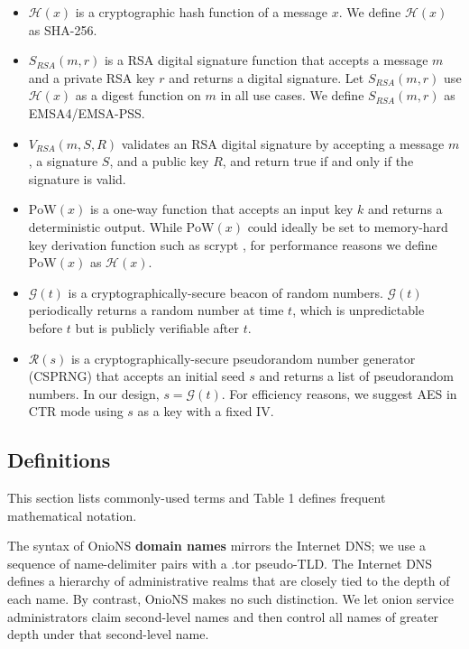 \documentclass[USenglish,oneside,twocolumn]{article}
\begin{document}
\begin{itemize}
	\item $ \mathcal{H}(x) $ is a cryptographic hash function of a message $ x $. We define $ \mathcal{H}(x) $ as SHA-256.
	\item $ S_{\mathit{RSA}}(m, r) $ is a RSA digital signature function that accepts a message $ m $ and a private RSA key $ r $ and returns a digital signature. Let $ S_{\mathit{RSA}}(m, r) $ use $ \mathcal{H}(x) $ as a digest function on $ m $ in all use cases. We define $ S_{\mathit{RSA}}(m, r) $ as EMSA4/EMSA-PSS.
	\item $ V_{\mathit{RSA}}(m, S, R) $ validates an RSA digital signature by accepting a message $ m $, a signature $ S $, and a public key $ R $, and return true if and only if the signature is valid.
	\item $ \mathrm{PoW}(x) $ is a one-way function that accepts an input key $ k $ and returns a deterministic output. While $ \mathrm{PoW}(x) $ could ideally be set to memory-hard key derivation function such as scrypt \cite{percival2012scrypt}, for performance reasons we define $ \mathrm{PoW}(x) $ as $ \mathcal{H}(x) $.
	\item $ \mathcal{G}(t) $ is a cryptographically-secure beacon of random numbers. $ \mathcal{G}(t) $ periodically returns a random number at time $ t $, which is unpredictable before $t$ but is publicly verifiable after $t$. %
	\item $ \mathcal{R}(s) $ is a cryptographically-secure pseudorandom number generator (CSPRNG) that accepts an initial seed $ s $ and returns a list of pseudorandom numbers. In our design, $ s = \mathcal{G}(t) $. For efficiency reasons, we suggest AES in CTR mode using $ s $ as a key with a fixed IV.
\end{itemize}

\subsection{Definitions}

This section lists commonly-used terms and Table 1 defines frequent mathematical notation.

The syntax of OnioNS \textbf{domain names} mirrors the Internet DNS; we use a sequence of name-delimiter pairs with a .tor pseudo-TLD. The Internet DNS defines a hierarchy of administrative realms that are closely tied to the depth of each name. By contrast, OnioNS makes no such distinction. We let onion service administrators claim second-level names and then control all names of greater depth under that second-level name.
\end{document}
